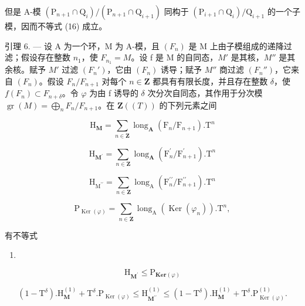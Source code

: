 但是 A-模 \((\mathrm{P}_{n+1} \cap \mathrm{Q}_i)/(\mathrm{P}_{n+1} \cap \mathrm{Q}_{i+1})\) 同构于 \((\mathrm{P}_{i+1} \cap \mathrm{Q}_i)/\mathrm{Q}_{i+1}\) 的一个子模，因而不等式 (16) 成立。

引理 6. --- 设 A 为一个环，M 为 A-模，且 \((F_{n})\) 是 M 上由子模组成的递降过滤；假设存在整数 \(n_{1}\)，使 \(F_{n_{1}} = M\)。设 f 是 M 的自同态，\(M'\) 是其核，\(M''\) 是其余核。赋予 \(M'\) 过滤 \((F_{n}')\)，它由 \((F_{n})\) 诱导；赋予 \(M''\) 商过滤 \((F_{n}'')\)，它来自 \((F_{n})\)。假设 \(F_{n}/F_{n+1}\) 对每个 \(n \in \mathbf{Z}\) 都具有有限长度，并且存在整数 \(\delta\)，使 \(f(F_{n}) \subset F_{n+\delta}\)。令 \(\varphi\) 为由 f 诱导的 \(\delta\) 次分次自同态，其作用于分次模 \(\operatorname{gr}(M) = \bigoplus_{n} F_{n}/F_{n+1}\)。在 \(\mathbf{Z}((T))\) 的下列元素之间

\[
\mathrm{H} _ {\mathbf {M}} = \sum_ {n \in \mathbf {Z}} \operatorname{long} _ {\mathbf {A}} (\mathrm{F} _ {n} / \mathrm{F} _ {n + 1}). \mathrm{T} ^ {n}
\]

\[
\mathrm{H} _ {\mathbf {M} ^ {\prime}} = \sum_ {n \in \mathbf {Z}} \operatorname{long} _ {\mathbf {A}} (\mathrm{F} _ {n} ^ {\prime} / \mathrm{F} _ {n + 1} ^ {\prime}). \mathrm{T} ^ {n}
\]

\[
\mathrm{H} _ {\mathrm{M} ^ {\prime \prime}} = \sum_ {n \in \mathbf {Z}} \operatorname{long} _ {\mathrm{A}} (\mathrm{F} _ {n} ^ {\prime \prime} / \mathrm{F} _ {n + 1} ^ {\prime \prime}). \mathrm{T} ^ {n}
\]

\[
\mathrm{P} _ {\operatorname{Ker} (\varphi)} = \sum_ {n \in \mathbf {Z}} \operatorname{long} _ {\mathrm{A}} (\operatorname{Ker} (\varphi_ {n})). \mathrm{T} ^ {n},
\]

有不等式

\begin{enumerate}
\def\labelenumi{(\arabic{enumi})}
\setcounter{enumi}{16}
\tightlist
\item
\end{enumerate}

\[
\mathrm{H} _ {\mathbf {M} ^ {\prime}} \leqslant \mathrm{P} _ {\mathbf {K e r} (\varphi)}\tag{18}
\]

\[
(1 - \mathrm{T} ^ {\delta}). \mathrm{H} _ {\mathbf {M}} ^ {(1)} + \mathrm{T} ^ {\delta}. \mathrm{P} _ {\operatorname{Ker} (\varphi)} \leqslant \mathrm{H} _ {\mathbf {M} ^ {\prime \prime}} ^ {(1)} \leqslant (1 - \mathrm{T} ^ {\delta}). \mathrm{H} _ {\mathbf {M}} ^ {(1)} + \mathrm{T} ^ {\delta}. \mathrm{P} _ {\operatorname{Ker} (\varphi)} ^ {(1)}.
\]

